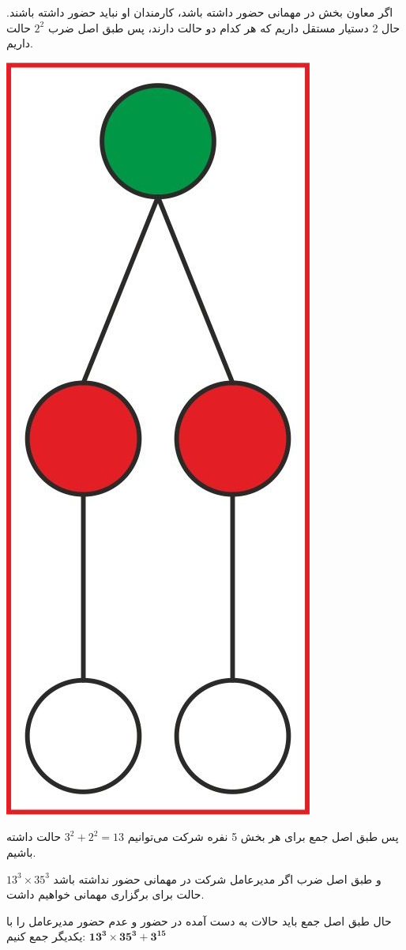     اگر معاون بخش در مهمانی حضور داشته باشد، کارمندان او نباید حضور داشته باشند. حال 2 دستیار مستقل داریم که هر کدام دو حالت دارند، پس طبق اصل ضرب $2^2$ حالت داریم.
    \begin{center}
    	\includegraphics[scale=0.1]{CombinatorialAnalysis/Problems/1/7.jpg}
    \end{center}
    
    پس طبق اصل جمع برای هر بخش 5 نفره شرکت می‌توانیم $ 3^2 + 2^2 = 13 $ حالت داشته باشیم.
    
    و طبق اصل ضرب اگر مدیرعامل شرکت در مهمانی حضور نداشته باشد $ 13^3 \times  35 ^ 3 $ حالت برای برگزاری مهمانی خواهیم داشت.
    
    حال طبق اصل جمع باید حالات به دست آمده در حضور و عدم حضور مدیرعامل را با یکدیگر جمع کنیم:   
    $\mathbf{ 13^3 \times  35 ^ 3  + 3^{15} }$
